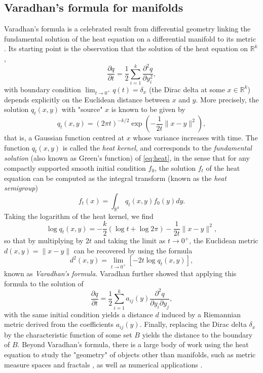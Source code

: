 \documentclass[11pt]{article}
\def\R{\mathbb{R}}
\def\log{\operatorname{log}}
\theoremstyle{definition}
\begin{document}
\subsection{Varadhan's formula for manifolds}
Varadhan's formula is a celebrated result from differential geometry linking the fundamental solution of the heat equation on a differential manifold to its metric \cite{varadhanBehaviorFundamentalSolution1967,varadhanDiffusionProcessesSmall1967}. Its starting point is the observation that the solution of the heat equation on $\R^k$,
\begin{equation} \label{eq:heat} 
    \frac{\partial q}{\partial t} = \frac{1}{2} \sum_{i=1}^k \frac{\partial^2 q}{\partial y_i^2},
\end{equation}
with boundary condition $\lim_{t \rightarrow 0^+} q(t) = \delta_x$ (the Dirac delta at some $x \in \R^k$) depends explicitly on the Euclidean distance between $x$ and $y$. More precisely, the solution $q_t (x,y)$ with "source" $x$ is known to be given by
\begin{equation} 
    q_t(x,y) = (2\pi t)^{-k/2} \exp \left(-\frac{1}{2t} \|x-y\|^2 \right), 
\end{equation}
that is, a Gaussian function centred at $x$ whose variance increases with time. The function $q_t (x,y)$ is called the \textit{heat kernel}, and corresponds to the \textit{fundamental solution} (also known as Green's function) of \eqref{eq:heat}, in the sense that for any compactly supported smooth initial condition $f_0$, the solution $f_t$ of the heat equation can be computed as the integral transform (known as the \textit{heat semigroup})
$$ f_t(x) = \int_{\R^k} q_t (x,y) f_0(y) dy. $$
Taking the logarithm of the heat kernel, we find
$$ \log q_t (x,y) = -\frac{k}{2} (\log t + \log 2\pi) - \frac{1}{2t} \|x-y\|^2, $$
so that by multiplying by $2t$ and taking the limit as $t\rightarrow 0^+$, the Euclidean metric $d(x,y) = \|x-y\|$ can be recovered by using the formula
$$ d^2 (x,y) = \lim_{t \rightarrow 0^+} [-2t \log q_t (x,y)], $$
known as \textit{Varadhan's formula}. Varadhan \cite{varadhanBehaviorFundamentalSolution1967} further showed that applying this formula to the solution of
$$ \frac{\partial q}{\partial t} = \frac{1}{2} \sum_{i=1}^k a_{ij} (y) \frac{\partial^2 q}{\partial y_i \partial y_j}, $$
with the same initial condition yields a distance $d$ induced by a Riemannian metric derived from the coefficients $a_{ij}(y)$. Finally, replacing the Dirac delta $\delta_x$ by the characteristic function of some set $B$ yields the distance to the boundary of $B$. Beyond Varadhan's formula, there is a large body of work using the heat equation to study the "geometry" of objects other than manifolds, such as metric measure spaces and fractals \cite{molchanovDIFFUSIONPROCESSESRIEMANNIAN1975,grigoryanAnalysisFractalSpaces2022,grigoryanHeatKernelsMetric2003a}, as well as numerical applications \cite{craneHeatMethodDistance2017,sharpVectorHeatMethod2019,belyaevADMMbasedSchemeDistance2020}.
\end{document}
